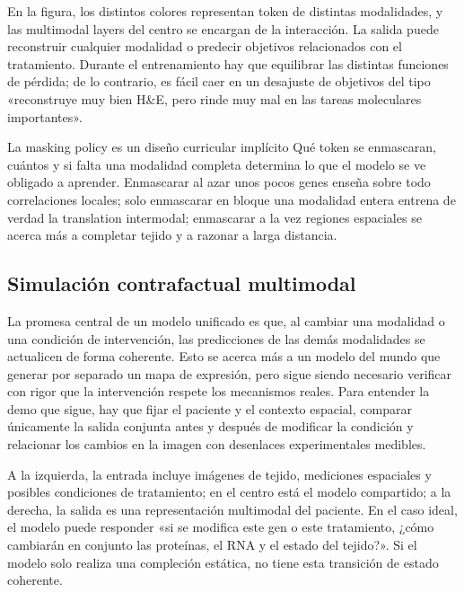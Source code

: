 
En la figura, los distintos colores representan token de distintas modalidades, y las multimodal layers del centro se encargan de la interacción. La salida puede reconstruir cualquier modalidad o predecir objetivos relacionados con el tratamiento. Durante el entrenamiento hay que equilibrar las distintas funciones de pérdida; de lo contrario, es fácil caer en un desajuste de objetivos del tipo «reconstruye muy bien H\&E, pero rinde muy mal en las tareas moleculares importantes».

\begin{knowledgebox}{La masking policy es un diseño curricular implícito}
Qué token se enmascaran, cuántos y si falta una modalidad completa determina lo que el modelo se ve obligado a aprender. Enmascarar al azar unos pocos genes enseña sobre todo correlaciones locales; solo enmascarar en bloque una modalidad entera entrena de verdad la translation intermodal; enmascarar a la vez regiones espaciales se acerca más a completar tejido y a razonar a larga distancia.
\end{knowledgebox}

\subsection{Simulación contrafactual multimodal}

La promesa central de un modelo unificado es que, al cambiar una modalidad o una condición de intervención, las predicciones de las demás modalidades se actualicen de forma coherente. Esto se acerca más a un modelo del mundo que generar por separado un mapa de expresión, pero sigue siendo necesario verificar con rigor que la intervención respete los mecanismos reales. Para entender la demo que sigue, hay que fijar el paciente y el contexto espacial, comparar únicamente la salida conjunta antes y después de modificar la condición y relacionar los cambios en la imagen con desenlaces experimentales medibles.


A la izquierda, la entrada incluye imágenes de tejido, mediciones espaciales y posibles condiciones de tratamiento; en el centro está el modelo compartido; a la derecha, la salida es una representación multimodal del paciente. En el caso ideal, el modelo puede responder «si se modifica este gen o este tratamiento, ¿cómo cambiarán en conjunto las proteínas, el RNA y el estado del tejido?». Si el modelo solo realiza una compleción estática, no tiene esta transición de estado coherente.

